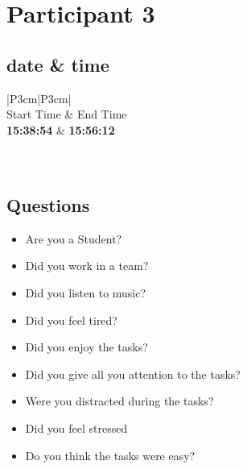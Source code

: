 \section{Participant 3}


\subsection{date \& time}
\begin{table}[ht]
  \begin{tabular}{|P{3cm}|P{3cm}|}
	    	\\ \hline
    Start Time      			& End Time   					\\ \hline
   \textbf{15:38:54} 	& \textbf{15:56:12}    	\\ \hline
       						\\ \hline
    			\\ \hline
  \end{tabular}
  \newline\newline
  \caption{p1: date and time}\label{dandt1}
\end{table}

\subsection{Questions}
\begin{itemize}
  \item[\Checkmark] Are you a Student?
  \item[\XSolidBrush] Did you work in a team?
  \item[\XSolidBrush] Did you listen to music?
  \item[\Checkmark] Did you feel tired?
  \item[\XSolidBrush] Did you enjoy the tasks?
  \item[\XSolidBrush] Did you give all you attention to the tasks?
  \item[\XSolidBrush] Were you distracted during the tasks?
  \item[\Checkmark] Did you feel stressed
  \item[\XSolidBrush] Do you think the tasks were easy?  
\end{itemize}

\newpage

